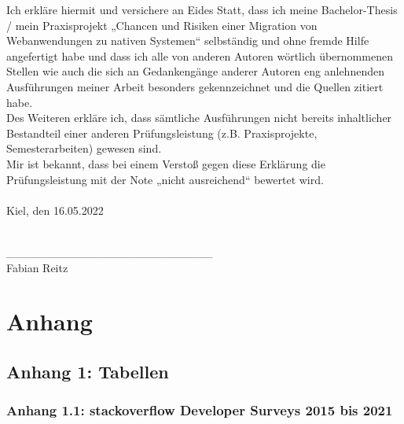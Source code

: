 \documentclass[a4paper]{scrartcl}
\begin{document}
Ich erkläre hiermit und versichere an Eides Statt, dass ich meine Bachelor-Thesis / mein Praxisprojekt „Chancen und Risiken einer Migration von Webanwendungen zu nativen Systemen“ selbständig und ohne fremde Hilfe angefertigt habe und dass ich alle von anderen Autoren wörtlich übernommenen Stellen wie auch die sich an Gedankengänge anderer Autoren eng anlehnenden Ausführungen meiner Arbeit besonders gekennzeichnet und die Quellen zitiert habe. \\
Des Weiteren erkläre ich, dass sämtliche Ausführungen nicht bereits inhaltlicher Bestandteil einer anderen Prüfungsleistung (z.B. Praxisprojekte, Semesterarbeiten) gewesen sind. \\
Mir ist bekannt, dass bei einem Verstoß gegen diese Erklärung die Prüfungsleistung mit der Note „nicht ausreichend“ bewertet wird. \\ \\

Kiel, den 16.05.2022 \\ \\ 

\begin{tabbing}
	\_\_\_\_\_\_\_\_\_\_\_\_\_\_\_\_\_\_\_\_\_\_\_\_\_ \\
	Fabian Reitz
\end{tabbing}


\newpage

\appendix

\section*{Anhang}

\subsection*{Anhang 1: Tabellen}

\subsubsection*{Anhang 1.1: stackoverflow Developer Surveys 2015 bis 2021}
\end{document}
